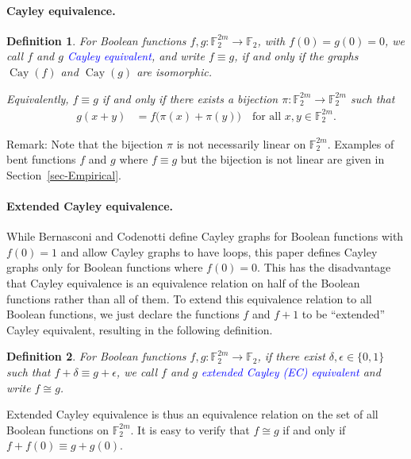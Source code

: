 \documentclass[12pt,a4paper]{article}
\newcommand{\mb}[1]{\mathbb{#1}}
\newcommand{\F}{\mb{F}}
\newcommand{\To}{\rightarrow}
\newcommand{\Emph}[1]{\emph{\textcolor{blue}{#1}}}
\newcommand{\Cay}[1]{\operatorname{Cay}\left(#1\right)}
\newtheorem{Definition}{Definition}
\begin{document}
\paragraph*{Cayley equivalence.}
\begin{Definition}
%
For Boolean functions $f, g : \F_2^{2m} \To \F_2$, with $f(0)=g(0)=0$,
we call $f$ and $g$ \Emph{Cayley equivalent},
and write $f \equiv g$,
if and only if the graphs $\Cay{f}$ and $\Cay{g}$ are isomorphic.

Equivalently, $f \equiv g$ if and only if
there exists a bijection $\pi : \F_2^{2m} \To \F_2^{2m}$ such that
\begin{align*}
g(x+y) &= f \big(\pi(x)+\pi(y)\big) \quad \text{for all~} x,y \in \F_2^{2m}.
\end{align*}
\end{Definition}
Remark: Note that the bijection $\pi$ is not necessarily linear on $\F_2^{2m}$.
Examples of bent functions $f$ and $g$ where $f \equiv g$ but the bijection is not linear
are given in Section~\ref{sec-Empirical}.
\paragraph*{Extended Cayley equivalence.}
%
While Bernasconi and Codenotti \cite{BerC99} define Cayley graphs for Boolean functions with
$f(0)=1$ and allow Cayley graphs to have loops, this paper defines Cayley
graphs only for Boolean functions where $f(0)=0$.
This has the disadvantage that Cayley equivalence is an equivalence relation on half
of the Boolean functions rather than all of them.
To extend this equivalence relation to all Boolean functions,
we just declare the functions $f$ and $f+1$ to be ``extended'' Cayley equivalent,
resulting in the following definition.
\begin{Definition}
For Boolean functions $f, g : \F_2^{2m} \To \F_2$,
if there exist $\delta, \epsilon \in \{0,1\}$ such that $f + \delta \equiv g + \epsilon$,
we call $f$ and $g$ \Emph{extended Cayley (EC) equivalent} and write $f \cong g$.
\end{Definition}
Extended Cayley equivalence is thus an equivalence relation on the set of all Boolean functions on
$\F_2^{2m}$.
It is easy to verify that $f \cong g$ if and only if $f+f(0) \equiv g+g(0)$.
\end{document}
